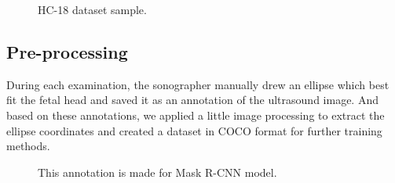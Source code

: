 	\begin{figure}[H]
		\centering
		\hfill %
		\hfill %
		\caption{HC-18 dataset sample.}
		\label{fig:us_image}
	\end{figure}

	
\subsection{Pre-processing}
\label{subsection:preprocess}
\noindent

	During each examination, the sonographer manually drew an ellipse which best fit the fetal head and saved it as an annotation of the ultrasound image. And based on these annotations, we applied a little image processing to extract the ellipse coordinates and created a dataset in COCO format for further training methods.
	
	\begin{figure}[H]
		\centering
		\caption{This annotation is made for Mask R-CNN model.}
		\label{fig:processed_annotation}
	\end{figure}
	

